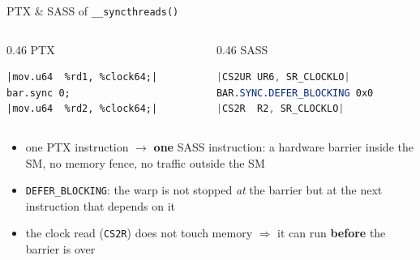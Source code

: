 \documentclass[aspectratio=169, numbering=fraction]{beamer}
\begin{document}
\begin{frame}[fragile]{PTX \& SASS of \texttt{\_\_syncthreads()}}
  \footnotesize
  \begin{columns}[t,onlytextwidth]
    \begin{column}{0.46\textwidth}
      PTX
\begin{lstlisting}[language=ptx, basicstyle=\ttfamily\scriptsize]
|mov.u64  %rd1, %clock64;|
bar.sync 0;
|mov.u64  %rd2, %clock64;|
\end{lstlisting}
    \end{column}
    \begin{column}{0.46\textwidth}
      SASS
\begin{lstlisting}[language=sass, basicstyle=\ttfamily\scriptsize]
|CS2UR UR6, SR_CLOCKLO|
BAR.SYNC.DEFER_BLOCKING 0x0
|CS2R  R2, SR_CLOCKLO|
\end{lstlisting}
    \end{column}
  \end{columns}

  \vspace{1.5em}
  \begin{itemize}\itemsep3pt
    \item one PTX instruction $\to$ \textbf{one} SASS instruction: a hardware barrier inside the
          SM, no memory fence, no traffic outside the SM
    \item \texttt{DEFER\_BLOCKING}: the warp is not stopped \emph{at} the barrier but at the next
          instruction that depends on it
    \item the clock read (\texttt{CS2R}) does not touch memory $\Rightarrow$ it can run
          \textbf{before} the barrier is over
  \end{itemize}
\end{frame}
\end{document}
